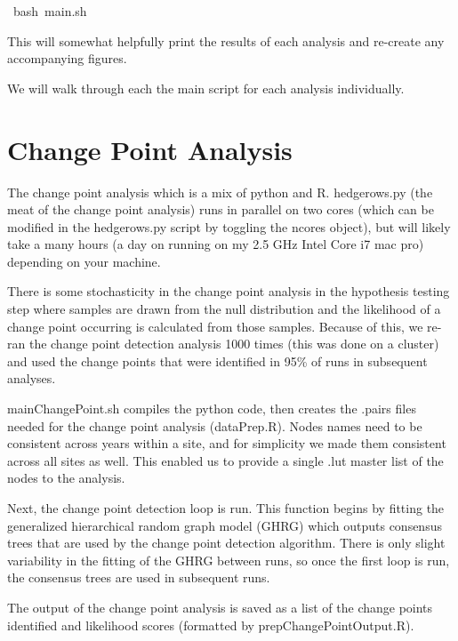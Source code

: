 \documentclass{article}\usepackage[]{graphicx}\usepackage[]{color}
\makeatletter
\newcommand{\hlstd}[1]{\textcolor[rgb]{0.345,0.345,0.345}{#1}}%
\newenvironment{kframe}{%
 \def\at@end@of@kframe{}%
 \ifinner\ifhmode%
  \def\at@end@of@kframe{\end{minipage}}%
  \begin{minipage}{\columnwidth}%
 \fi\fi%
 \def\FrameCommand##1{\hskip\@totalleftmargin \hskip-\fboxsep
 \colorbox{shadecolor}{##1}\hskip-\fboxsep
     \hskip-\linewidth \hskip-\@totalleftmargin \hskip\columnwidth}%
 \MakeFramed {\advance\hsize-\width
   \@totalleftmargin\z@ \linewidth\hsize
   \@setminipage}}%
 {\par\unskip\endMakeFramed%
 \at@end@of@kframe}
\newenvironment{knitrout}{}{} %
\makeatother
\begin{document}
\begin{knitrout}
\color{fgcolor}\begin{kframe}
\noindent
\ttfamily
\hlstd{\ bash\ main.sh}\hspace*{\fill}
\mbox{}
\normalfont
\end{kframe}
\end{knitrout}

This will somewhat helpfully print the results of each analysis
and re-create any accompanying figures.

We will walk through each the main script for each analysis
individually.


\section{Change Point Analysis}

The change point analysis which is a mix of python and R. hedgerows.py
(the meat of the change point analysis) runs in parallel on two cores
(which can be modified in the hedgerows.py script by toggling the
ncores object), but will likely take a many hours (a day on running on
my 2.5 GHz Intel Core i7 mac pro) depending on your machine.

There is some stochasticity in the change point analysis in the
hypothesis testing step where samples are drawn from the null
distribution and the likelihood of a change point occurring is
calculated from those samples. Because of this, we re-ran the change
point detection analysis 1000 times (this was done on a cluster) and
used the change points that were identified in 95\% of runs in
subsequent analyses.

mainChangePoint.sh compiles the python code, then creates the .pairs
files needed for the change point analysis (dataPrep.R). Nodes names
need to be consistent across years within a site, and for simplicity
we made them consistent across all sites as well. This enabled us to
provide a single .lut master list of the nodes to the analysis.

Next, the change point detection loop is run. This function begins by
fitting the generalized hierarchical random graph model (GHRG) which
outputs consensus trees that are used by the change point detection
algorithm. There is only slight variability in the fitting of the
GHRG between runs, so once the first loop is run, the consensus trees
are used in subsequent runs.

The output of the change point analysis is saved as a list of the
change points identified and likelihood scores (formatted by
prepChangePointOutput.R).
\end{document}
